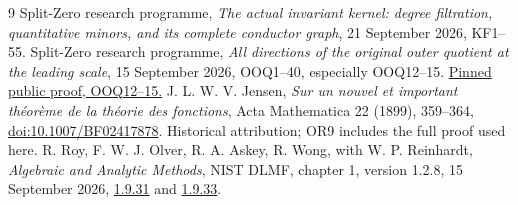 \documentclass[11pt]{article}
\begin{document}
\begin{thebibliography}{9}
 Split-Zero research programme, \emph{The actual invariant
kernel: degree filtration, quantitative minors, and its complete
conductor graph}, 21 September 2026, KF1--55.
 Split-Zero research programme,
\emph{All directions of the original outer quotient at the leading
scale}, 15 September 2026, OOQ1--40, especially OOQ12--15.
\href{https://github.com/KokunoYumeto/zeta-function-research-reader/blob/5992ad50c0f2a06921f1fcaded7b4e38097c0739/workbenches/splitzero-tandem/continuations/20260920-original-kernel-mixed-determinants/providers/09_INPUT_CUMULATIVE_PROOFS.tex#L23367}{Pinned public proof, OOQ12--15.}
 J. L. W. V. Jensen,
\emph{Sur un nouvel et important th\'eor\`eme de la th\'eorie des
fonctions}, Acta Mathematica 22 (1899), 359--364,
\href{https://doi.org/10.1007/BF02417878}{doi:10.1007/BF02417878}.
Historical attribution; OR9 includes the full proof used here.
 R. Roy, F. W. J. Olver, R. A. Askey, R. Wong,
with W. P. Reinhardt,
\emph{Algebraic and Analytic Methods}, NIST DLMF, chapter 1,
version 1.2.8, 15 September 2026,
\href{https://dlmf.nist.gov/1.9.E31}{1.9.31} and
\href{https://dlmf.nist.gov/1.9.E33}{1.9.33}.
\end{thebibliography}
\end{document}
